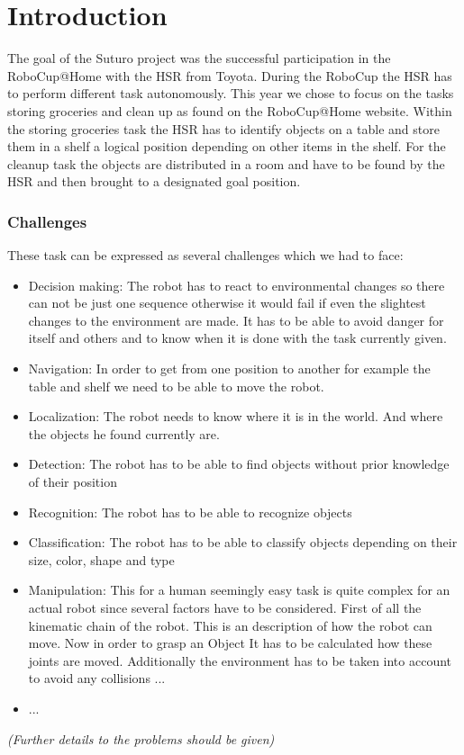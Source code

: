 \documentclass[main.tex]{subfiles}
\begin{document}
	\chapter{Introduction}
	\chapterauthor{}
	
	The goal of the Suturo project was the successful participation in the RoboCup@Home with the HSR from Toyota. During the RoboCup the HSR has to perform different task autonomously. 
	This year we chose to focus on the tasks storing groceries and clean up as found on the RoboCup@Home website. Within the storing groceries task the HSR has to identify objects on a table and store them in a shelf a logical position depending on other items in the shelf. For the cleanup task the objects are distributed in a room and have to be found by the HSR and then brought to a designated goal position.
	
	\subsection{Challenges} 
	These task can be expressed as several challenges which we had to face:
	\begin{itemize}
		\item Decision making: The robot has to react to environmental changes so there can not be just one sequence otherwise it would fail if even the slightest changes to the environment are made. It has to be able to avoid danger for itself and others and to know when it is done with the task currently given.
		\item Navigation: In order to get from one position to another for example the table and shelf we need to be able to move the robot. 
		\item Localization: The robot needs to know where it is in the world. And where the objects he found currently are.
		\item Detection: The robot has to be able to find objects without prior knowledge of their position
		\item Recognition: The robot has to be able to recognize objects
		\item Classification: The robot has to be able to classify objects depending on their size, color, shape and type
		\item Manipulation: This for a human seemingly easy task is quite complex for an actual robot since several factors have to be considered. First of all the kinematic chain of the robot. This is an description of how the robot can move. Now in order to grasp an Object It has to be calculated how these joints are moved. Additionally the environment has to be taken into account to avoid any collisions ...
		\item ...

	\end{itemize}
	
	\textit{(Further details to the problems should be given)}	
	
\end{document}
